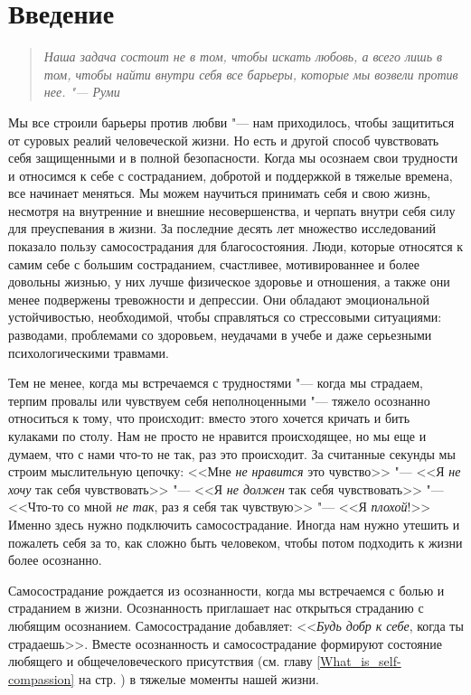 
\section{Введение} \label{Introduction}

\begin{quote}
	\textit{Наша задача состоит не в том, чтобы искать любовь, а всего лишь в том, чтобы найти внутри себя все барьеры, которые мы возвели против нее. "--- Руми}
\end{quote}
	
	Мы все строили барьеры против любви "--- нам приходилось, чтобы защититься от суровых реалий человеческой жизни. Но есть и другой способ чувствовать себя защищенными и в полной безопасности. Когда мы осознаем свои трудности и относимся к себе с состраданием, добротой и поддержкой в тяжелые времена, все начинает меняться. Мы можем научиться принимать себя и свою жизнь, несмотря на внутренние и внешние несовершенства, и черпать внутри себя силу для преуспевания в жизни. За последние десять лет множество исследований показало пользу самосострадания для благосостояния. Люди, которые относятся к самим себе с большим состраданием, счастливее, мотивированнее и более довольны жизнью, у них лучше физическое здоровье и отношения, а также они менее подвержены тревожности и депрессии. Они обладают эмоциональной устойчивостью, необходимой, чтобы справляться со стрессовыми ситуациями: разводами, проблемами со здоровьем, неудачами в учебе и даже серьезными психологическими травмами. 
	
	Тем не менее, когда мы встречаемся с трудностями "--- когда мы страдаем, терпим провалы или чувствуем себя неполноценными "--- тяжело осознанно относиться к тому, что происходит: вместо этого хочется кричать и бить кулаками по столу. Нам не просто не нравится происходящее, но мы еще и думаем, что с нами что-то не так, раз это происходит. За считанные секунды мы строим мыслительную цепочку: <<Мне \emph{не нравится} это чувство>> "--- <<Я \emph{не хочу} так себя чувствовать>> "--- <<Я \emph{не должен} так себя чувствовать>> "--- <<Что-то со мной \emph{не так}, раз я себя так чувствую>> "--- <<Я \emph{плохой}!>> Именно здесь нужно подключить самосострадание. Иногда нам нужно утешить и пожалеть себя за то, как сложно быть человеком, чтобы потом подходить к жизни более осознанно. 
	
	Самосострадание рождается из осознанности, когда мы встречаемся с болью и страданием в жизни. Осознанность приглашает нас открыться страданию с любящим осознанием. Самосострадание добавляет: <<\emph{Будь добр к себе}, когда ты страдаешь>>. Вместе осознанность и самосострадание формируют состояние любящего и общечеловеческого присутствия (см. главу \ref{What_is_self-compassion} на стр. \pageref{What_is_self-compassion}) в тяжелые моменты нашей жизни. 
	
